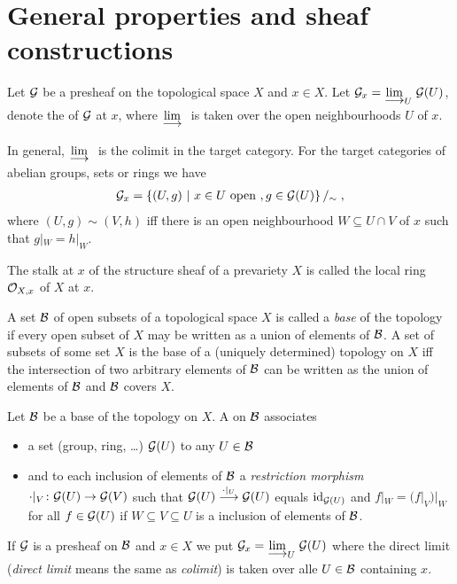 \documentclass[a4paper,parskip=half,numbers=enddot, DIV=12]{scrreprt}
\begin{document}
\section{General properties and sheaf constructions}
\begin{defi}[Stalk]
    Let $\mathcal{G}$ be a presheaf on the topological space $X$ and $x\in X$. Let $\Gg_x = \colimit[U] \Gg(U)$, denote the  of $\mathcal{G}$ at $x$, where $\colimit$ is taken over the open neighbourhoods $U$ of $x$.
\end{defi}
\begin{rem*}
    In general, $\colimit$ is the colimit in the target category. For the target categories of abelian groups, sets or rings we have
    \begin{align*}
        \mathcal{G}_x = \left\{(U,g) \ \middle|\  x\in U \text{ open }, g\in \mathcal{G}(U)\right\}/_\sim\;,
    \end{align*}
    where $(U,g)\sim (V,h)$ iff there is an open neighbourhood $W\subseteq U\cap V$ of $x$ such that $g|_W = h|_W$. 
\end{rem*}
\begin{example}
    The stalk at $x$ of the structure sheaf of a prevariety $X$ is called the local ring $\mathcal{O}_{X,x}$ of $X$ at $x$.
\end{example}
\begin{rem*}
    A set $\mathcal{B}$ of open subsets of a topological space $X$ is called a \emph{base} of the topology if every open subset of $X$ may be written as a union of elements of $\mathcal{B}$. A set of subsets of some set $X$ is the base of a (uniquely determined) topology on $X$ iff the intersection of two arbitrary elements of $\mathcal{B}$ can be written as the union of elements of $\mathcal{B}$ and $\mathcal{B}$ covers $X$.
\end{rem*}
\begin{defi}
    Let $\mathcal{B}$ be a base of the topology on $X$. A  on $\mathcal{B}$ associates
    \begin{itemize}
    	\item a set (group, ring, \ldots) $\mathcal{G}(U)$ to any $U\in \mathcal{B}$
    	\item and to each inclusion of elements of $\mathcal{B}$ a \emph{restriction morphism}  		$\cdot|_V\colon\Gg(U) \morphism \Gg(V)$
    	such that $\Gg(U) \morphism[\cdot|_U]\Gg(U)$ equals $\operatorname{id}_{\mathcal{G}(U)}$ and $f|_W = (f|_V)|_W$ for all $f\in \mathcal{G}(U)$ if $W\subseteq V\subseteq U$ is a inclusion of elements of $\mathcal{B}$. 
    \end{itemize}
	 If $\mathcal{G}$ is a presheaf on $\mathcal{B}$ and $x\in X$ we put $\Gg_x = \colimit[U] \Gg(U)$ where the direct limit (\emph{direct limit} means the same as \emph{colimit}) is taken over alle $U\in \mathcal{B}$ containing $x$.
\end{defi}
\end{document}
